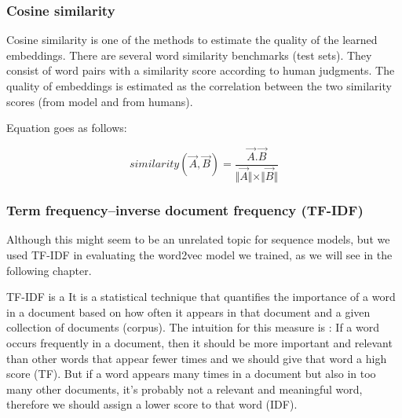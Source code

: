 

\subsubsection{Cosine similarity}
\label{cosine}
Cosine similarity is one of the methods to estimate the quality of the learned embeddings. There are several word similarity benchmarks (test sets). They consist of word pairs with a similarity score according to human judgments. The quality of embeddings is estimated as the correlation between the two similarity scores (from model and from humans). 

Equation goes as follows:


\begin{equation} 
\label{eq:cosine_similarity}
   similarity(\Vec{A},\Vec{B}) = \frac{\Vec{A} . \Vec{B}}
   {\Vert{\Vec{A}}\Vert \times \Vert \Vec{B} \Vert }
\end{equation}







\subsubsection{Term frequency–inverse document frequency (TF-IDF)}
\label{tfidf}
Although this might seem to be an unrelated topic for sequence models, but we used TF-IDF in evaluating the word2vec model we trained, as we will see in the following chapter.

TF-IDF is a  It is a statistical technique that quantifies the importance of a word in a document based on how often it appears in that document and a given collection of documents (corpus). The intuition for this measure is : If a word occurs frequently in a document, then it should be more important and relevant than other words that appear fewer times and we should give that word a high score (TF). But if a word appears many times in a document but also in too many other documents, it’s probably not a relevant and meaningful word, therefore we should assign a lower score to that word (IDF).

